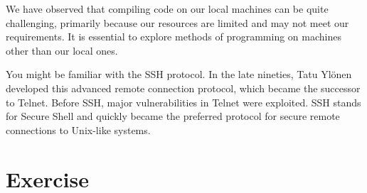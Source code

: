\documentclass{dcbl/challenge}
\begin{document}
We have observed that compiling code on our local machines can be quite challenging, primarily because our resources are limited and may not meet our requirements. It is essential to explore methods of programming on machines other than our local ones.

You might be familiar with the SSH protocol. In the late nineties, Tatu Ylönen developed this advanced remote connection protocol, which became the successor to Telnet. Before SSH, major vulnerabilities in Telnet were exploited. SSH stands for Secure Shell and quickly became the preferred protocol for secure remote connections to Unix-like systems.

\section*{Exercise}
\end{document}
